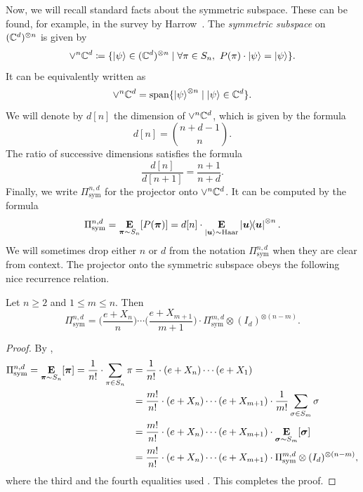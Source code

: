 \documentclass{article}
\begin{document}
Now, we will recall standard facts about the symmetric subspace.
These can be found, for example, in the survey by Harrow~\cite{Har13}.
The \emph{symmetric subspace} on $(\mathbb C^d)^{\otimes n}$ is given by
\begin{equation*}
    \lor^n \mathbb C^d \coloneqq \{\ket{\psi} \in (\mathbb C^d)^{\otimes n} \mid \forall \pi \in S_n, ~ P(\pi) \cdot \ket{\psi} = \ket{\psi}\}.
\end{equation*}
It can be equivalently written as
\begin{equation*}
    \lor^n \mathbb C^d = \mathrm{span}\{\ket{\psi}^{\otimes n} \mid \ket{\psi} \in \mathbb C^d\}.
\end{equation*}
We will denote by $d[n]$ the dimension of $\lor^n \mathbb C^d$, which is given by the formula
\begin{equation*}
    d[n] = \binom{n+d-1}{n}.
\end{equation*}
The ratio of successive dimensions satisfies the formula
\begin{equation}\label{eq:ratio}
    \frac{d[n]}{d[n+1]}=\frac{n+1}{n+d}.
\end{equation}
Finally, we write $\Pi_{\mathrm{sym}}^{n,d}$ for the projector onto $\lor^n \mathbb C^d$.
It can be computed by the formula
\begin{equation}\label{eq:pi-sym}
    \Pi_{\mathrm{sym}}^{n,d}
    = \mathop{\bf E\/}_{\boldsymbol{\pi} \sim S_n} [P(\boldsymbol{\pi})]
    = d[n] \cdot \mathop{\bf E\/}_{\ket{\boldsymbol{u}} \sim \mathrm{Haar}} \ketbra{\boldsymbol{u}}^{\otimes n}.
\end{equation}
We will sometimes drop either $n$ or $d$ from the notation $\Pi_{\mathrm{sym}}^{n,d}$ when they are clear from context.
The projector onto the symmetric subspace obeys the following nice recurrence relation.

\begin{proposition}\label{prop:pi-sym-recurrence}
    Let $n \geq 2$ and $1 \leq m \leq n$. Then
    \begin{equation*}
         \Pi_{\mathrm{sym}}^{n,d} = \Big(\frac{e + X_n}{n}\Big) \cdots \Big(\frac{e + X_{m+1}}{m+1}\Big) \cdot\Pi_{\mathrm{sym}}^{m,d} \otimes (I_d)^{\otimes (n-m)}.
    \end{equation*}
\end{proposition}
\begin{proof}
    By ,
    \begin{align*}
        \Pi_{\mathrm{sym}}^{n,d}
        = \mathop{\bf E\/}_{\boldsymbol{\pi} \sim S_n} [\boldsymbol{\pi}]
        = \frac{1}{n!}\cdot \sum_{\pi \in S_n} \pi
        &= \frac{1}{n!}\cdot(e + X_n) \cdots (e + X_1)\\
        &= \frac{m!}{n!} \cdot (e + X_n) \cdots (e+ X_{m+1}) \cdot \frac{1}{m!} \sum_{\sigma \in S_{m}} \sigma\\
        &= \frac{m!}{n!}\cdot (e + X_n) \cdots (e+ X_{m+1}) \cdot \mathop{\bf E\/}_{\boldsymbol{\sigma} \sim S_{m}} [\boldsymbol{\sigma}]\\
        &= \frac{m!}{n!} \cdot (e + X_n) \cdots (e + X_{m+1}) \cdot \Pi_{\mathrm{sym}}^{m,d} \otimes (I_d)^{\otimes (n-m)},
    \end{align*}
    where the third and the fourth equalities used .
    This completes the proof.
\end{proof}
\end{document}
